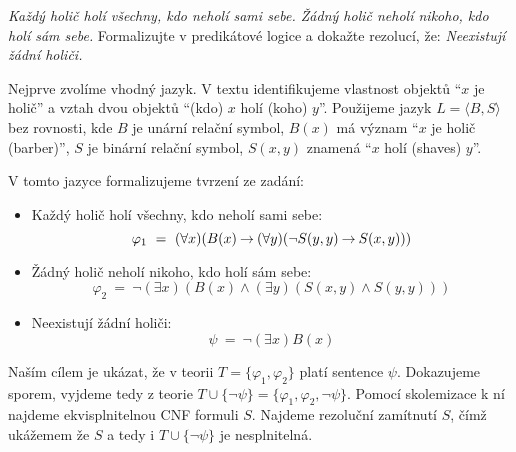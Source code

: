 \begin{problem} 
    
    \emph{Každý holič holí všechny, kdo neholí sami sebe. Žádný holič neholí nikoho, kdo holí sám sebe.} Formalizujte v predikátové logice a dokažte rezolucí, že: \emph{Neexistují žádní holiči.}

    \begin{solution}

        Nejprve zvolíme vhodný jazyk. V textu identifikujeme vlastnost objektů ``$x$ je holič'' a vztah dvou objektů ``(kdo) $x$ holí (koho) $y$''. Použijeme jazyk $L=\langle B, S\rangle$ bez rovnosti, kde $B$ je unární relační symbol, $B(x)$ má význam ``$x$ je holič (barber)'', $S$ je binární relační symbol, $S(x,y)$ znamená ``$x$ holí (shaves) $y$''. 
        
        V tomto jazyce formalizujeme tvrzení ze zadání:
        \begin{itemize}
            \item Každý holič holí všechny, kdo neholí sami sebe: 
            $$
            \varphi_1\ =\ (\forall x)(B(x)\mathbin{\rightarrow} (\forall y)(\neg S(y,y)\mathbin{\rightarrow} S(x,y)))
            $$
            \item Žádný holič neholí nikoho, kdo holí sám sebe: 
            $$
            \varphi_2\ =\ \neg (\exists x)(B(x) \land (\exists y)(S(x,y)\land S(y,y)))
            $$
            \item Neexistují žádní holiči:
            $$
            \psi\ =\ \neg (\exists x)B(x)
            $$
        \end{itemize}
        Naším cílem je ukázat, že v teorii $T=\{\varphi_1,\varphi_2\}$ platí sentence $\psi$. Dokazujeme sporem, vyjdeme tedy z teorie $T\cup\{\neg\psi\}=\{\varphi_1,\varphi_2,\neg\psi\}$. Pomocí skolemizace k ní najdeme ekvisplnitelnou CNF formuli $S$. Najdeme rezoluční zamítnutí $S$, čímž ukážemem že $S$ a tedy i $T\cup\{\neg\psi\}$ je nesplnitelná.


\end{solution}
\end{problem}
